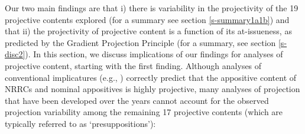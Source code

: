 \documentclass[11pt,fleqn]{article}
\newcommand{\6}{\mbox{$[\hspace*{-.6mm}[$}}
\newcommand{\9}{\mbox{$]\hspace*{-.6mm}]$}}
\begin{document}
Our two main findings are that i) there is variability in the projectivity of the 19 projective contents explored (for a summary see section \ref{s-summary1a1b}) and that ii) the projectivity of projective content is a function of its at-issueness, as predicted by the Gradient Projection Principle (for a summary, see section \ref{s-disc2}). In this section, we discuss implications of our findings for analyses of projective content, starting with the first finding.  Although analyses of conventional implicatures (e.g., \citealt{potts05,murray2014,anderbois-etal2015}) correctly predict that the appositive content of NRRCs and nominal appositives is highly projective, many analyses of projection that have been developed over the years cannot account for the observed projection variability among the remaining 17 projective contents (which are typically referred to as `presuppositions'):
\end{document}
